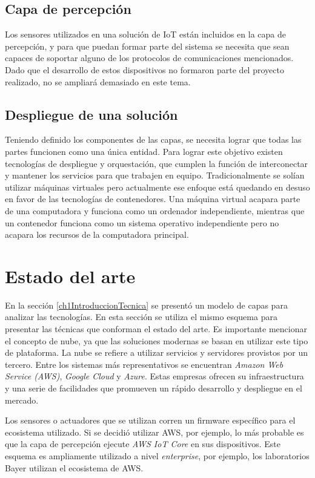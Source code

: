 \subsection{Capa de percepción}
Los sensores utilizados en una solución de IoT están incluidos en la capa de percepción, y para que puedan formar parte del sistema se necesita que sean capaces de soportar alguno de los protocolos de comunicaciones mencionados. Dado que el desarrollo de estos dispositivos no formaron parte del proyecto realizado, no se ampliará demasiado en este tema.

\subsection{Despliegue de una solución}
Teniendo definido los componentes de las capas, se necesita lograr que todas las partes funcionen como una única entidad. Para lograr este objetivo existen tecnologías de despliegue y orquestación, que cumplen la función de interconectar y mantener los servicios para que trabajen en equipo. Tradicionalmente se solían utilizar máquinas virtuales pero actualmente ese enfoque está quedando en desuso en favor de las tecnologías de contenedores. Una máquina virtual acapara parte de una computadora y funciona como un ordenador independiente, mientras que un contenedor funciona como un sistema operativo independiente pero no acapara los recursos de la computadora principal.


\section{Estado del arte}
\label{ch1EstadoDelArte}

En la sección \ref{ch1IntroduccionTecnica} se presentó un modelo de capas para analizar las tecnologías.
En esta sección se utiliza el mismo esquema para presentar las técnicas que conforman el estado del arte.
Es importante mencionar el concepto de nube, ya que las soluciones modernas se basan en utilizar este tipo de plataforma.
La nube se refiere a utilizar servicios y servidores provistos por un tercero.
Entre los sistemas más representativos se encuentran \emph{Amazon Web Service (AWS)}, \emph{Google Cloud} y \emph{Azure}.
Estas empresas ofrecen su infraestructura y una serie de facilidades que promueven un rápido desarrollo y despliegue en el mercado.

Los sensores o actuadores que se utilizan corren un firmware específico para el ecosistema utilizado.
Si se decidió utilizar AWS, por ejemplo, lo más probable es que la capa de percepción ejecute \emph{AWS IoT Core} en sus dispositivos.
Este esquema es ampliamente utilizado a nivel \emph{enterprise}, por ejemplo, los laboratorios Bayer utilizan el ecosistema de AWS. \citep{WEBSITE:AWSBayer}

